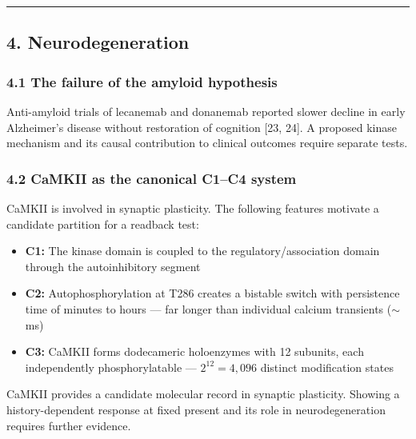 \documentclass[
]{article}
\providecommand{\tightlist}{%
  \setlength{\itemsep}{0pt}\setlength{\parskip}{0pt}}
\begin{document}
\begin{center}\rule{0.5\linewidth}{0.5pt}\end{center}

\hypertarget{neurodegeneration}{%
\subsection{4. Neurodegeneration}\label{neurodegeneration}}

\hypertarget{the-failure-of-the-amyloid-hypothesis}{%
\subsubsection{4.1 The failure of the amyloid
hypothesis}\label{the-failure-of-the-amyloid-hypothesis}}

Anti-amyloid trials of lecanemab and donanemab reported slower decline
in early Alzheimer's disease without restoration of cognition {[}23,
24{]}. A proposed kinase mechanism and its causal contribution to
clinical outcomes require separate tests.

\hypertarget{camkii-as-the-canonical-c1c4-system}{%
\subsubsection{4.2 CaMKII as the canonical C1--C4
system}\label{camkii-as-the-canonical-c1c4-system}}

CaMKII is involved in synaptic plasticity. The following features
motivate a candidate partition for a readback test:

\begin{itemize}
\tightlist
\item
  \textbf{C1:} The kinase domain is coupled to the
  regulatory/association domain through the autoinhibitory segment
\item
  \textbf{C2:} Autophosphorylation at T286 creates a bistable switch
  with persistence time of minutes to hours --- far longer than
  individual calcium transients (\(\sim\)ms)
\item
  \textbf{C3:} CaMKII forms dodecameric holoenzymes with 12 subunits,
  each independently phosphorylatable --- \(2^{12} = 4{,}096\) distinct
  modification states
\end{itemize}

CaMKII provides a candidate molecular record in synaptic plasticity.
Showing a history-dependent response at fixed present and its role in
neurodegeneration requires further evidence.
\end{document}
